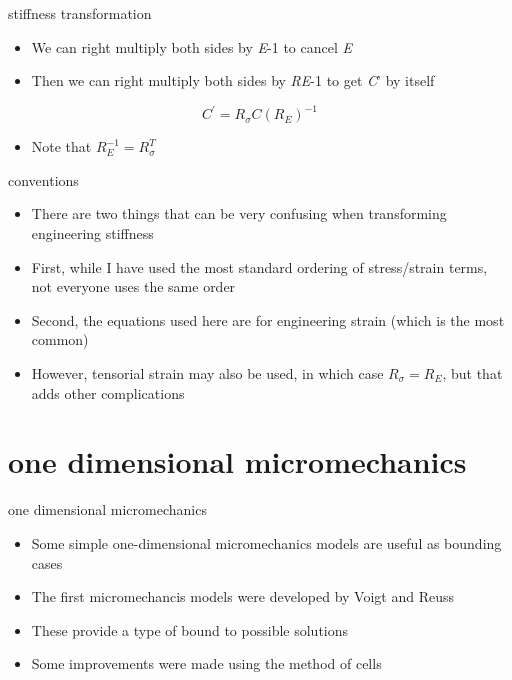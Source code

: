 \documentclass[
  letterpaper,
  ignorenonframetext,
  aspectratio=43,
  handout,
  12pt]{beamer}
\providecommand{\tightlist}{%
  \setlength{\itemsep}{0pt}\setlength{\parskip}{0pt}}
\providecommand{\tightlist}{%
\setlength{\itemsep}{0pt}\setlength{\parskip}{0pt}}
\begin{document}
\begin{frame}{stiffness transformation}
\protect\hypertarget{stiffness-transformation-1}{}
\begin{itemize}
\tightlist
\item
  We can right multiply both sides by \emph{E}-1 to cancel \emph{E}
\item
  Then we can right multiply both sides by \emph{R}\emph{E}-1 to get
  \emph{C}' by itself
\end{itemize}

\[C^\prime = R_\sigma C (R_E)^{-1}\]

\begin{itemize}
\tightlist
\item
  Note that \(R_E^{-1} = R_\sigma^T\)
\end{itemize}
\end{frame}

\begin{frame}{conventions}
\protect\hypertarget{conventions}{}
\begin{itemize}
\tightlist
\item
  There are two things that can be very confusing when transforming
  engineering stiffness
\item
  First, while I have used the most standard ordering of stress/strain
  terms, not everyone uses the same order
\item
  Second, the equations used here are for engineering strain (which is
  the most common)
\item
  However, tensorial strain may also be used, in which case
  \(R_\sigma = R_E\), but that adds other complications
\end{itemize}
\end{frame}

\hypertarget{one-dimensional-micromechanics}{%
\section{one dimensional
micromechanics}\label{one-dimensional-micromechanics}}

\begin{frame}{one dimensional micromechanics}
\protect\hypertarget{one-dimensional-micromechanics-1}{}
\begin{itemize}
\tightlist
\item
  Some simple one-dimensional micromechanics models are useful as
  bounding cases
\item
  The first micromechancis models were developed by Voigt and Reuss
\item
  These provide a type of bound to possible solutions
\item
  Some improvements were made using the method of cells
\end{itemize}
\end{frame}
\end{document}
